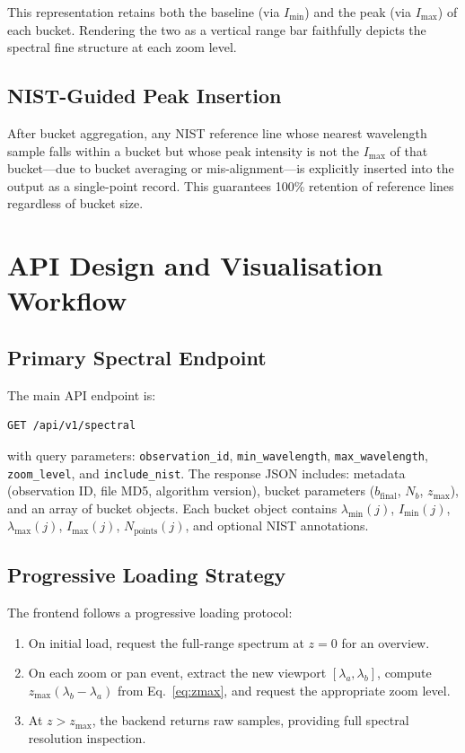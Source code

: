 \documentclass[a4paper,twocolumn,10pt]{article}
\begin{document}
This representation retains both the baseline (via $I_{\min}$) and
the peak (via $I_{\max}$) of each bucket.  Rendering the two as a
vertical range bar faithfully depicts the spectral fine structure
at each zoom level.

\subsection{NIST-Guided Peak Insertion}

After bucket aggregation, any NIST reference line whose nearest
wavelength sample falls within a bucket but whose peak intensity is
not the $I_{\max}$ of that bucket---due to bucket averaging or
mis-alignment---is explicitly inserted into the output as a
single-point record.  This guarantees 100\% retention of reference
lines regardless of bucket size.


\section{API Design and Visualisation Workflow}
\label{sec:api}

\subsection{Primary Spectral Endpoint}

The main API endpoint is:

\begin{verbatim}
GET /api/v1/spectral
\end{verbatim}

with query parameters: \texttt{observation\_id},
\texttt{min\_wavelength}, \texttt{max\_wavelength},
\texttt{zoom\_level}, and \texttt{include\_nist}.  The response JSON
includes: metadata (observation ID, file MD5, algorithm version),
bucket parameters ($b_{\text{final}}$, $N_b$, $z_{\max}$), and an
array of bucket objects.  Each bucket object contains
$\lambda_{\min}(j)$, $I_{\min}(j)$, $\lambda_{\max}(j)$,
$I_{\max}(j)$, $N_{\text{points}}(j)$, and optional NIST annotations.

\subsection{Progressive Loading Strategy}

The frontend follows a progressive loading protocol:
\begin{enumerate}[nosep,leftmargin=*]
  \item On initial load, request the full-range spectrum at $z = 0$
    for an overview.
  \item On each zoom or pan event, extract the new viewport
    $[\lambda_a, \lambda_b]$, compute $z_{\max}(\lambda_b -
    \lambda_a)$ from Eq.~\eqref{eq:zmax}, and request the
    appropriate zoom level.
  \item At $z > z_{\max}$, the backend returns raw samples,
    providing full spectral resolution inspection.
\end{enumerate}
\end{document}
